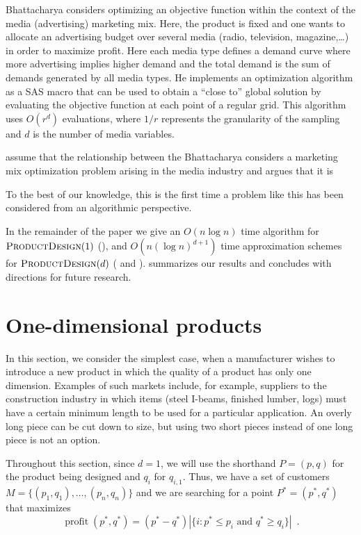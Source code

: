 \documentclass[lotsofwhite]{patmorin}
\newcommand{\val}{\operatorname{profit}}
\begin{document}
Bhattacharya \cite{bXX} considers optimizing an objective function within
the context of the media (advertising) marketing mix.  Here, the product
is fixed and one wants to allocate an advertising budget over several
media (radio, television, magazine,\ldots) in order to maximize profit.
Here each media type defines a demand curve where more advertising implies
higher demand and the total demand is the sum of demands generated by
all media types.  He implements an optimization algorithm as a SAS macro
that can be used to obtain a ``close to'' global solution by evaluating
the objective function at each point of a regular grid.  This algorithm
uses $O(r^d)$ evaluations, where $1/r$ represents the granularity of
the sampling and $d$ is the number of media variables.










assume that the relationship between the  Bhattacharya considers a marketing mix optimization
problem arising in the media industry and argues that it is  


To the best of our knowledge, this is the first time a
problem like this has been considered from an algorithmic perspective.


In the remainder of the paper we give an $O(n\log n)$ time algorithm for
$\textsc{ProductDesign}(1)$ (), and $O(n(\log n)^{d+1})$ time
approximation schemes for $\textsc{ProductDesign}(d)$ (
and ).   summarizes our results and
concludes with directions for future research.


\section{One-dimensional products}

In this section, we consider the simplest case, when a manufacturer
wishes to introduce a new product in which the quality of a product
has only one dimension.  Examples of such markets include, for example,
suppliers to the construction industry in which items (steel I-beams,
finished lumber, logs) must have a certain minimum length to be used for
a particular application.  An overly long piece can be cut down to size,
but using two short pieces instead of one long piece is not an option.

Throughout this section, since $d=1$, we will use the shorthand $P=(p,q)$
for the product being designed and $q_i$ for $q_{i,1}$.  Thus, we have a
set of customers $M=\{(p_1,q_1),\ldots,(p_{n},q_n)\}$ and we are searching
for a point $P^*=(p^*,q^*)$ that maximizes 
\[
   \val(p^*,q^*) = (p^*-q^*)
     |\{i : \mbox{$p^*\le p_i$ and $q^*\ge q_i$}\}|  \enspace .
\]
\end{document}
